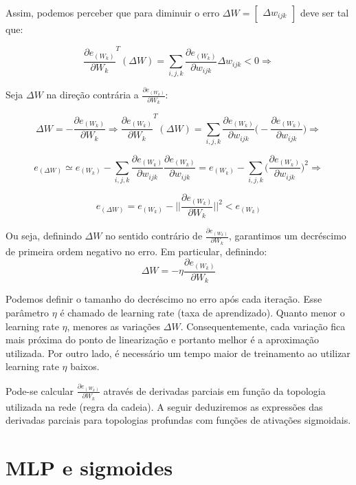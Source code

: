 \documentclass[
	12pt,				%
	oneside,			%
	a4paper,			%
	english,			%
	french,				%
	spanish,			%
	brazil,				%
	]{abntex2}
\begin{document}
Assim, podemos perceber que para diminuir o erro $\Delta W = \begin{bmatrix}
\Delta w_{ijk}
\end{bmatrix}$ deve ser tal que:

$$ \frac{ \partial e_{(W_{k})} } { \partial W_k }^T(\Delta W) = \sum_{i,j,k} \frac{ \partial e_{(W_{k})} } { \partial w_{ijk} } \Delta w_{ijk} < 0  \Rightarrow $$

Seja $\Delta W$ na dire\c{c}\~ao contr\'aria a $ \frac{ \partial e_{(W_{k})} } { \partial W_k }$:

$$\Delta W = -  \frac{ \partial e_{(W_{k})} } { \partial W_k } \Rightarrow 
\frac{ \partial e_{(W_{k})} } { \partial W_k }^T(\Delta W) = 
\sum_{i,j,k} \frac{ \partial e_{(W_{k})} } { \partial w_{ijk} } \Big( - \frac{ \partial e_{(W_{k})} } { \partial w_{ijk} } \Big ) \Rightarrow $$

$$ e_{(\Delta W)} \simeq e_{(W_k)}
- \sum_{i,j,k} \frac{ \partial e_{(W_{k})} } { \partial w_{ijk} } \frac{ \partial e_{(W_{k})} } { \partial w_{ijk} }
=
e_{(W_k)}
- \sum_{i,j,k} \Big( \frac{ \partial e_{(W_{k})} } { \partial w_{ijk} } \Big)^2 \Rightarrow
$$

$$e_{(\Delta W)} = e_{(W_k)}
- \bigg|\bigg|  \frac{ \partial e_{(W_{k})} } { \partial W_k } \bigg|\bigg|^2 < e_{(W_k)}$$

Ou seja, definindo $\Delta W$ no sentido contr\'ario de $ \frac{ \partial e_{(W_{k})} } { \partial W_k }$, garantimos um decr\'escimo de primeira ordem negativo no erro. Em particular, definindo: 
$$\Delta W = - \eta  \frac{ \partial e_{(W_{k})} } { \partial W_k }  $$

Podemos definir o tamanho do decr\'escimo no erro ap\'os cada itera\c{c}\~ao. Esse par\^ametro $\eta$ \'e chamado de learning rate (taxa de aprendizado). Quanto menor o learning rate $\eta$, menores as varia\c{c}\~oes $\Delta W$. Consequentemente, cada variação fica mais próxima do ponto de linearização e portanto melhor \'e a aproxima\c{c}\~ao utilizada. Por outro lado, é necessário um tempo maior de treinamento ao utilizar learning rate $\eta$ baixos.

Pode-se calcular $ \frac{ \partial e_{(W_{k})} } { \partial W_k }$ através de derivadas parciais em fun\c{c}\~ao da topologia utilizada na rede (regra da cadeia). A seguir deduziremos as expressões das derivadas parciais para topologias profundas com funções de ativações sigmoidais.

\section{MLP e sigmoides}
\end{document}
